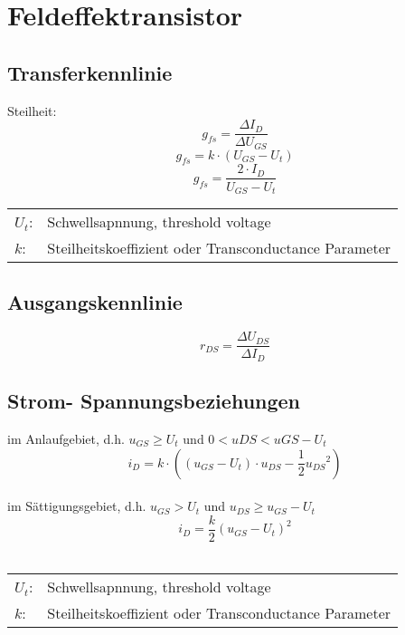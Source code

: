 



\newpage
\section{Feldeffektransistor}

\subsection{Transferkennlinie}
Steilheit:
\[ g_{fs} = \frac{\Delta I_{D}}{\Delta U_{GS}} \]
\[ g_{fs} = k \cdot (U_{GS} - U_t) \]
\[ g_{fs} = \frac{2 \cdot I_D}{U_{GS} - U_t} \]
\begin{tabular}{@{}ll}
  $U_t$:        & Schwellsapnnung, threshold voltage\\
  $k$:	    	& Steilheitskoeffizient oder Transconductance Parameter \\
\end{tabular}

\subsection{Ausgangskennlinie}
\[ r_{DS} = \frac{\Delta U_{DS}}{\Delta I_D}\]

\subsection{Strom- Spannungsbeziehungen}
im Anlaufgebiet, d.h. $u_{GS} \geq U_t$ und $0 < u{DS} < u{GS} - U_t$
\[ i_D = k \cdot \left( (u_{GS} - U_t) \cdot u_{DS} - \frac{1}{2} {u_{DS}}^2 \right) \]
\\
im Sättigungsgebiet, d.h. $u_{GS} > U_t$ und $u_{DS} \geq u_{GS} - U_t$
\[ i_D = \frac{k}{2} (u_{GS} - U_t)^2 \]\\
\begin{tabular}{@{}ll}
  $U_t$:        & Schwellsapnnung, threshold voltage\\
  $k$:	    	& Steilheitskoeffizient oder Transconductance Parameter \\
\end{tabular}